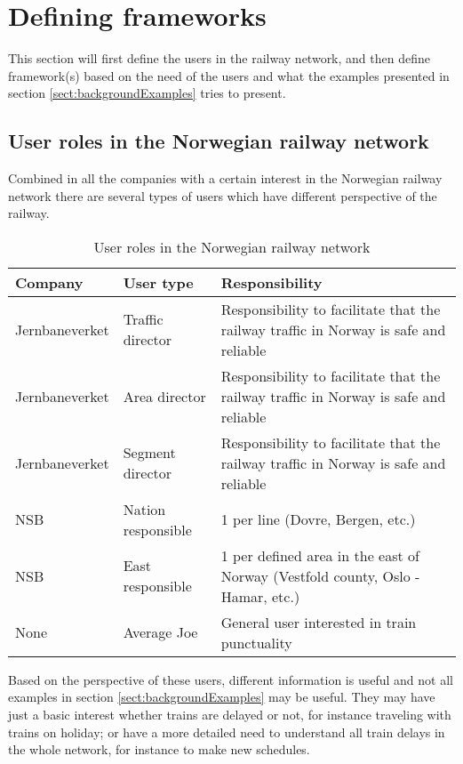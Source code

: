 
\section{Defining frameworks} %
\label{sec:defining_frameworks}
This section will first define the users in the railway network, and then
define framework(s) based on the need of the users and what the examples
presented in section \vref{sect:backgroundExamples} tries to present.

\subsection{User roles in the Norwegian railway network} %
\label{sub:user_roles_in_the_norwegian_railway_network}

Combined in all the companies with a certain interest in the Norwegian railway 
network there are several types of users which have different perspective of
the railway. 
\begin{table}[!h]\small
	\begin{tabularx}{\textwidth}{|l|l|X|}
		\hline
		Company & User type & Responsibility \\
		\hline
		Jernbaneverket & Traffic director & Responsibility to facilitate that the railway traffic in Norway is safe and reliable\\
		\hline
		Jernbaneverket & Area director & Responsibility to facilitate that the railway traffic in Norway is safe and reliable\\
		\hline
		Jernbaneverket & Segment director & Responsibility to facilitate that the railway traffic in Norway is safe and reliable\\
		\hline
		NSB & Nation responsible & 1 per line (Dovre, Bergen, etc.)\\
		\hline
		NSB & East responsible & 1 per defined area in the east of Norway (Vestfold county, Oslo - Hamar,
		etc.)\\
		\hline
		None & Average Joe & General user interested in train punctuality\\
		\hline
	\end{tabularx}
\caption{User roles in the Norwegian railway network}
\label{table:user_roles}
\end{table}

Based on the perspective of these users, different information is useful and
not all examples in section \ref{sect:backgroundExamples} may be useful. They
may have just a basic interest whether trains are delayed or not, for instance
traveling with trains on holiday; or have a more detailed need to understand
all train delays in the whole network, for instance to make new schedules. 

